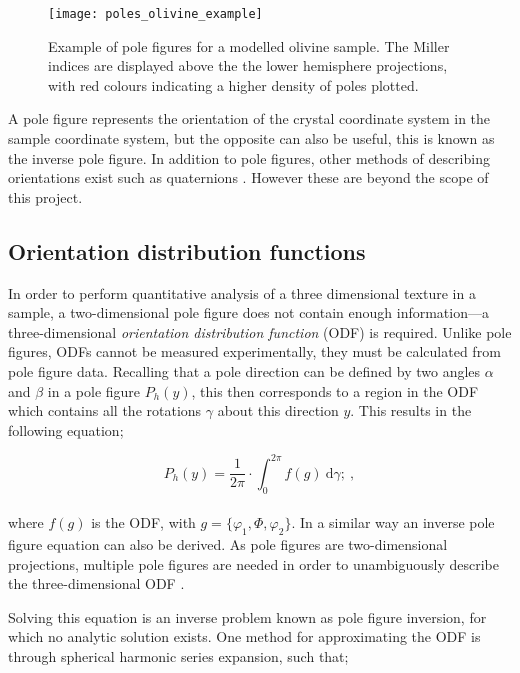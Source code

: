 \documentclass[a4paper,12pt,twoside]{report}
\numberwithin{equation}{chapter}
\begin{document}
\begin{figure}[h]
  \centering
    \texttt{[image: poles\_olivine\_example]}
  \caption[Pole figure olivine example]{Example of pole figures for a modelled olivine sample. The Miller indices are displayed above the the lower hemisphere projections, with red colours indicating a higher density of poles plotted.}
  \label{fig:pole_olivine_example}
\end{figure}

A pole figure represents the orientation of the crystal coordinate system in the sample coordinate system, but the opposite can also be useful, this is known as the inverse pole figure. In addition to pole figures, other methods of describing orientations exist such as quaternions \citep{Quaternions}. However these are beyond the scope of this project. 

\subsection{Orientation distribution functions} \label{subsec:ODFs}
In order to perform quantitative analysis of a three dimensional texture in a sample, a two-dimensional pole figure does not contain enough information---a three-dimensional \emph{orientation distribution function} (ODF) is required. Unlike pole figures, ODFs cannot be measured experimentally, they must be calculated from pole figure data. Recalling that a pole direction can be defined by two angles $\alpha$ and $\beta$ in a pole figure $P_h(y)$, this then corresponds to a region in the ODF which contains all the rotations $\gamma$ about this direction $y$. This results in the following equation;

\begin{equation} \label{eq:pole_figures}
P_h(y) = \frac{1}{2\pi} \cdot \int_{0}^{2\pi}f(g)\ \mathrm{d}\gamma;\ ,
\end{equation}
\\
where $f(g)$ is the ODF, with $g = \{\varphi_1,\Phi,\varphi_2\}$. In a similar way an inverse pole figure equation can also be derived. As pole figures are two-dimensional projections, multiple pole figures are needed in order to unambiguously describe the three-dimensional ODF \citep[and in fact it is only determined uniquely for an infinite number of pole figures,][]{Bunge1985}.



Solving this equation is an inverse problem known as pole figure inversion, for which no analytic solution exists. One method for approximating the ODF is through spherical harmonic series expansion, such that;
\end{document}
